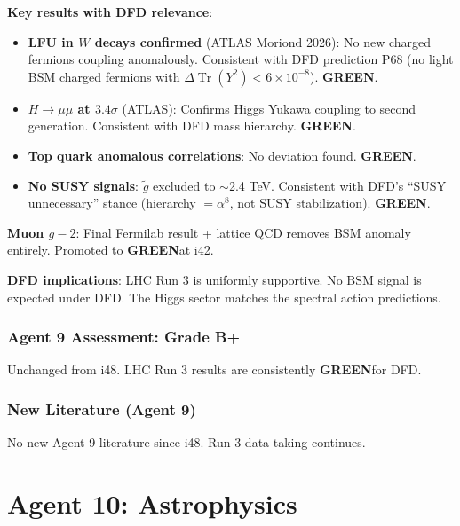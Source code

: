 \documentclass[11pt,a4paper]{article}
\newcommand{\GREEN}{\textcolor{dfdgreen}{\textbf{GREEN}}}
\newcommand{\Tr}{\operatorname{Tr}}
\begin{document}
\begin{tcolorbox}[colback=green!5!white, colframe=green!60!black,
  title={LHC Run 3 at 500 fb$^{-1}$: DFD Implications}]

\textbf{Key results with DFD relevance}:
\begin{itemize}
\item \textbf{LFU in $W$ decays confirmed} (ATLAS Moriond 2026): No new charged fermions coupling anomalously. Consistent with DFD prediction P68 (no light BSM charged fermions with $\Delta\Tr(Y^2) < 6 \times 10^{-8}$). \GREEN.
\item \textbf{$H \to \mu\mu$ at $3.4\sigma$} (ATLAS): Confirms Higgs Yukawa coupling to second generation. Consistent with DFD mass hierarchy. \GREEN.
\item \textbf{Top quark anomalous correlations}: No deviation found. \GREEN.
\item \textbf{No SUSY signals}: $\tilde{g}$ excluded to $\sim$2.4 TeV. Consistent with DFD's ``SUSY unnecessary'' stance (hierarchy $= \alpha^8$, not SUSY stabilization). \GREEN.
\end{itemize}

\textbf{Muon $g-2$}: Final Fermilab result + lattice QCD removes BSM anomaly entirely. Promoted to \GREEN at i42.

\textbf{DFD implications}: LHC Run 3 is uniformly supportive. No BSM signal is expected under DFD. The Higgs sector matches the spectral action predictions.
\end{tcolorbox}

\section{Agent 9 Assessment: Grade B+}

Unchanged from i48. LHC Run 3 results are consistently \GREEN for DFD.

\section{New Literature (Agent 9)}

No new Agent 9 literature since i48. Run 3 data taking continues.


\part{Agent 10: Astrophysics}
\label{part:agent10}
\end{document}
